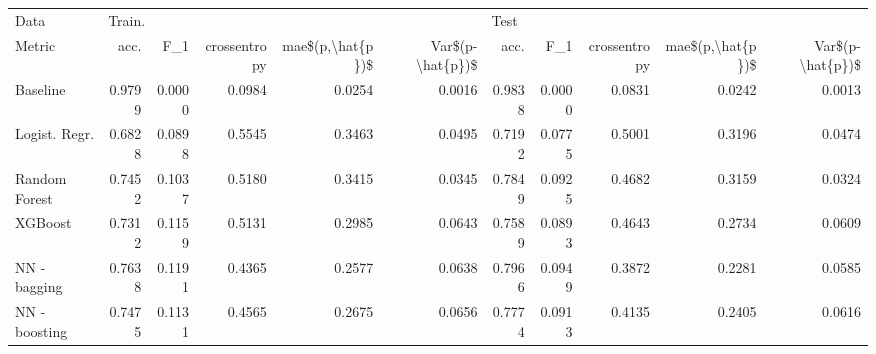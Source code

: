 \begin{tabular}{lrrrrrrrrrr}
\toprule
Data & \multicolumn{5}{l}{Train.} & \multicolumn{5}{l}{Test} \\
Metric &    acc. &     F\_1 & crossentropy & mae\$(p,\textbackslash hat\{p\})\$ & Var\$(p-\textbackslash hat\{p\})\$ &    acc. &     F\_1 & crossentropy & mae\$(p,\textbackslash hat\{p\})\$ & Var\$(p-\textbackslash hat\{p\})\$ \\
\midrule
Baseline      &  0.9799 &  0.0000 &       0.0984 &           0.0254 &           0.0016 &  0.9838 &  0.0000 &       0.0831 &           0.0242 &           0.0013 \\
Logist. Regr. &  0.6828 &  0.0898 &       0.5545 &           0.3463 &           0.0495 &  0.7192 &  0.0775 &       0.5001 &           0.3196 &           0.0474 \\
Random Forest &  0.7452 &  0.1037 &       0.5180 &           0.3415 &           0.0345 &  0.7849 &  0.0925 &       0.4682 &           0.3159 &           0.0324 \\
XGBoost       &  0.7312 &  0.1159 &       0.5131 &           0.2985 &           0.0643 &  0.7589 &  0.0893 &       0.4643 &           0.2734 &           0.0609 \\
NN - bagging  &  0.7638 &  0.1191 &       0.4365 &           0.2577 &           0.0638 &  0.7966 &  0.0949 &       0.3872 &           0.2281 &           0.0585 \\
NN - boosting &  0.7475 &  0.1131 &       0.4565 &           0.2675 &           0.0656 &  0.7774 &  0.0913 &       0.4135 &           0.2405 &           0.0616 \\
\bottomrule
\end{tabular}
